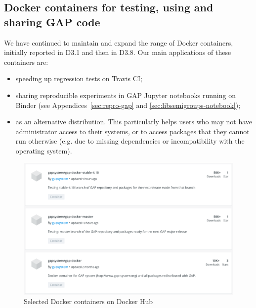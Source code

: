 %
%


\subsection{Docker containers for testing, using and sharing GAP code}\label{docker}

We have continued to maintain and expand the range of Docker containers,
initially reported in D3.1 and then in D3.8. Our main applications of
these containers are:
\begin{itemize}
\item speeding up regression tests on Travis CI;
\item sharing reproducible experiments in GAP Jupyter notebooks running on
  Binder (see Appendices~\ref{sec:repro-gap} and
  \ref{sec:libsemigroups-notebook});
\item as an alternative distribution.
This particularly helps users who may not have administrator access
  to their systems, or to access packages that they cannot run otherwise
  (e.g. due to missing dependencies or incompatibility with the operating system).
\end{itemize}

\begin{figure}[!ht]
    \centering
    \includegraphics[width=12cm]{images/gap-docker}
    \caption{Selected \GAP Docker containers on Docker Hub}
    \label{fig:gap-docker}
\end{figure}
 
